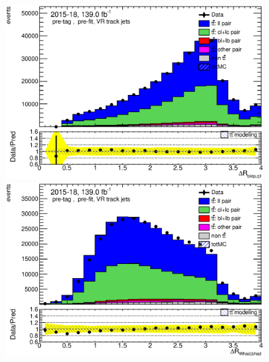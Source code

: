 \documentclass[letterpaper,12pt]{article}
\begin{document}
\begin{figure}
\begin{minipage}[b]{.45\textwidth}
	\end{minipage}\hfill
	\begin{minipage}[b]{.45\textwidth}
	\centering
	\includegraphics[width=1\textwidth]{Oct_distributions/pretagNoRwDL1rwithhighpTVRJets_scaledall/DataMC_dRblepq1.eps} 
	\end{minipage}\hfill
	\begin{minipage}[b]{.45\textwidth}
	\centering
	\includegraphics[width=1\textwidth]{Oct_distributions/pretagNoRwDL1rwithhighpTVRJets_scaledall/DataMC_dRWhadbhad.eps} 
	\end{minipage}\hfill
	\begin{minipage}[b]{.45\textwidth}
	\centering

\end{minipage}
\end{figure}
\end{document}
